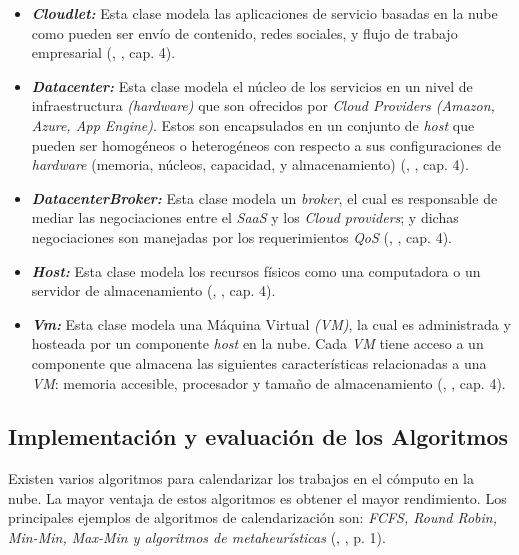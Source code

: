 \documentclass[jou,apacite]{apa6}
\begin{document}
\begin{itemize}
	\item \textit{\textbf{Cloudlet:}} Esta clase modela las aplicaciones de servicio basadas en la nube como pueden ser env\'io de contenido, redes sociales, y flujo de trabajo empresarial (\citeauthor{calheiros2011cloudsim}, \citeyear{calheiros2011cloudsim}, cap. 4).
	\item \textit{ \textbf{Datacenter:}} Esta clase modela el núcleo de los servicios en un nivel de infraestructura \textit{(hardware)} que son ofrecidos por \textit{Cloud Providers (Amazon, Azure, App Engine)}. Estos son encapsulados en un conjunto de \textit{host} que pueden ser homogéneos o heterogéneos con respecto a sus configuraciones de \textit{hardware} (memoria, n\'ucleos, capacidad, y almacenamiento) (\citeauthor{calheiros2011cloudsim}, \citeyear{calheiros2011cloudsim}, cap. 4).
	\item \textit{ \textbf{DatacenterBroker:}} Esta clase modela un \textit{broker}, el cual es responsable de mediar las negociaciones entre el \textit{SaaS} y los \textit{Cloud providers}; y dichas negociaciones son manejadas por los requerimientos \textit{QoS} (\citeauthor{calheiros2011cloudsim}, \citeyear{calheiros2011cloudsim}, cap. 4).
	\item  \textit{\textbf{Host:}} Esta clase modela los recursos f\'isicos como una computadora o un servidor de almacenamiento (\citeauthor{calheiros2011cloudsim}, \citeyear{calheiros2011cloudsim}, cap. 4).
	\item  \textit{\textbf{Vm:}} Esta clase modela una M\'aquina Virtual \textit{(VM)}, la cual es administrada y hosteada por un componente \textit{host} en la nube. Cada \textit{VM} tiene acceso a un componente que almacena las siguientes características relacionadas a una \textit{VM}: memoria accesible, procesador y tamaño de almacenamiento (\citeauthor{calheiros2011cloudsim}, \citeyear{calheiros2011cloudsim}, cap. 4).
\end{itemize}

\subsection{Implementaci\'on y evaluación de los Algoritmos}

Existen varios algoritmos para calendarizar los trabajos en el c\'omputo en la nube. La mayor ventaja de estos algoritmos es obtener el mayor rendimiento. Los principales ejemplos de algoritmos de calendarizaci\'on son: \textit{FCFS, Round Robin, Min-Min, Max-Min y algoritmos de metaheurísticas}  (\citeauthor{shimpy2014different}, \citeyear{shimpy2014different}, p. 1).
\end{document}
